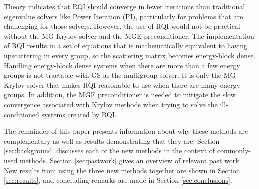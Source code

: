 \documentclass{article}                                                                           %
\begin{document}
Theory indicates that RQI should converge in fewer iterations than traditional eigenvalue solvers like Power Iteration (PI), particularly for problems that are challenging for those solvers. However, the use of RQI would not be practical without the MG Krylov solver and the MGE preconditioner. The implementation of RQI results in a set of equations that is mathematically equivalent to having upscattering in every group, so the scattering matrix becomes energy-block dense. Handling energy-block dense systems when there are more than a few energy groups is not tractable with GS as the multigroup solver. It is only the MG Krylov solver that makes RQI reasonable to use when there are many energy groups. In addition, the MGE preconditioner is needed to mitigate the slow convergence associated with Krylov methods when trying to solve the ill-conditioned systems created by RQI. 

The remainder of this paper presents information about why these methods are complementary as well as results demonstrating that they are. Section \ref{sec:background} discusses each of the new methods in the context of commonly-used methods. Section \ref{sec:pastwork} gives an overview of relevant past work. New results from using the three new methods together are shown in Section \ref{sec:results}, and concluding remarks are made in Section \ref{sec:conclusions}.

\end{document}
